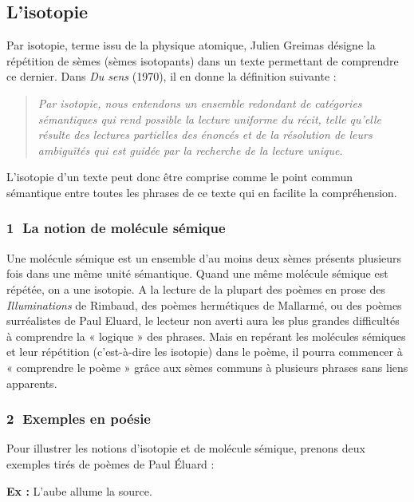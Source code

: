 \subsection{L’isotopie}
Par isotopie, terme issu de la physique atomique, Julien Greimas désigne la répétition de sèmes (sèmes isotopants) dans un texte permettant de comprendre ce dernier. Dans \textit{Du sens} (1970), il en donne la définition suivante :
\begin{quote}\small\itshape
Par isotopie, nous entendons un ensemble redondant de catégories sémantiques qui rend possible la lecture uniforme du récit, telle qu’elle résulte des lectures partielles des énoncés et de la résolution de leurs ambiguïtés qui est guidée par la recherche de la lecture unique.
\end{quote}
L’isotopie d’un texte peut donc être comprise comme le point commun sémantique entre toutes les phrases de ce texte qui en facilite la compréhension.

\subsubsection*{\textcircled{\scriptsize 1} La notion de molécule sémique}
Une molécule sémique est un ensemble d’au moins deux sèmes présents plusieurs fois dans une même unité sémantique. Quand une même molécule sémique est répétée, on a une isotopie. A la lecture de la plupart des poèmes en prose des \textit{Illuminations} de Rimbaud, des poèmes hermétiques de Mallarmé, ou des poèmes surréalistes de Paul Eluard, le lecteur non averti aura les plus grandes difficultés à comprendre la « logique » des phrases. Mais en repérant les molécules sémiques et leur répétition (c’est-à-dire les isotopie) dans le poème, il pourra commencer à « comprendre le poème » grâce aux sèmes communs à plusieurs phrases sans liens apparents.

\subsubsection*{\textcircled{\scriptsize 2} Exemples en poésie}
Pour illustrer les notions d’isotopie et de molécule sémique, prenons deux exemples tirés de poèmes de Paul Éluard :

\noindent\textbf{Ex :} L’aube allume la source.

